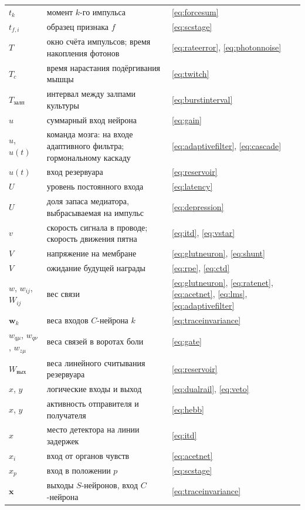 \begin{center}
\begin{longtable}{>{\raggedright}p{2.0cm}>{\raggedright}p{9.6cm}>{\raggedright\arraybackslash}p{2.4cm}}
$t_k$ & момент $k$-го импульса & \eqref{eq:forcesum} \\
$t_{f,i}$ & образец признака $f$ & \eqref{eq:scstage} \\
$T$ & окно счёта импульсов; время накопления фотонов & \eqref{eq:rateerror}, \eqref{eq:photonnoise} \\
$T_c$ & время нарастания подёргивания мышцы & \eqref{eq:twitch} \\
$T_{\text{залп}}$ & интервал между залпами культуры & \eqref{eq:burstinterval} \\
$u$ & суммарный вход нейрона & \eqref{eq:gain} \\
$u$, $u(t)$ & команда мозга: на входе адаптивного фильтра; гормональному каскаду & \eqref{eq:adaptivefilter}, \eqref{eq:cascade} \\
$u(t)$ & вход резервуара & \eqref{eq:reservoir} \\
$U$ & уровень постоянного входа & \eqref{eq:latency} \\
$U$ & доля запаса медиатора, выбрасываемая на импульс & \eqref{eq:depression} \\
$v$ & скорость сигнала в проводе; скорость движения пятна & \eqref{eq:itd}, \eqref{eq:vstar} \\
$V$ & напряжение на мембране & \eqref{eq:glutneuron}, \eqref{eq:shunt} \\
$V$ & ожидание будущей награды & \eqref{eq:rpe}, \eqref{eq:ctd} \\
$w$, $w_{ij}$, $W_{ij}$ & вес связи & \eqref{eq:glutneuron}, \eqref{eq:ratenet}, \eqref{eq:acetnet}, \eqref{eq:lms}, \eqref{eq:adaptivefilter} \\
$\mathbf w_k$ & веса входов $C$-нейрона $k$ & \eqref{eq:traceinvariance} \\
$w_{q\mu}$, $w_{q\nu}$, $w_{z\mu}$ & веса связей в воротах боли & \eqref{eq:gate} \\
$W_{\text{вых}}$ & веса линейного считывания резервуара & \eqref{eq:reservoir} \\
$x$, $y$ & логические входы и выход & \eqref{eq:dualrail}, \eqref{eq:veto} \\
$x$, $y$ & активность отправителя и получателя & \eqref{eq:hebb} \\
$x$ & место детектора на линии задержек & \eqref{eq:itd} \\
$x_i$ & вход от органов чувств & \eqref{eq:acetnet} \\
$x_p$ & вход в положении $p$ & \eqref{eq:scstage} \\
$\mathbf x$ & выходы $S$-нейронов, вход $C$-нейрона & \eqref{eq:traceinvariance} \\

\end{longtable}
\end{center}
